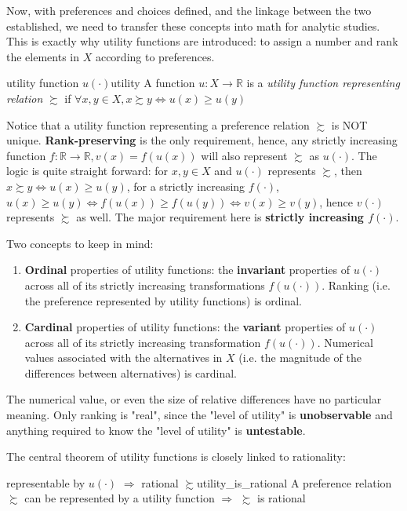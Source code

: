 Now, with preferences and choices defined, and the linkage between the two established, we need to transfer these concepts into math for analytic studies.
This is exactly why utility functions are introduced: to assign a number and rank the elements in $X$ according to preferences.

\begin{definition}{utility function $u(\cdot)$}{utility}
    A function $u:X\rightarrow\mathbb{R}$ is a \textit{utility function representing relation} $\succsim$ if $\forall x,y\in X,x\succsim y\Leftrightarrow u(x)\geq u(y)$
\end{definition}

Notice that a utility function representing a preference relation $\succsim$ is NOT unique. \textbf{Rank-preserving} is the only requirement, hence, any 
strictly increasing function $f:\mathbb{R}\rightarrow\mathbb{R},v(x)=f(u(x))$ will also represent $\succsim$ as $u(\cdot)$. The logic is quite straight forward: for $x,y\in X$ and $u(\cdot)$ represents $\succsim$, then $x\succsim y \Leftrightarrow u(x)\geq u(y)$, for a strictly increasing $f(\cdot)$, $u(x)\geq u(y)\Leftrightarrow f(u(x))\geq f(u(y))\Leftrightarrow v(x)\geq v(y)$, hence $v(\cdot)$ represents $\succsim$ as well.
The major requirement here is \textbf{strictly increasing $f(\cdot)$}.

Two concepts to keep in mind:
\begin{enumerate}
    \item \textbf{Ordinal} properties of utility functions: the \textbf{invariant} properties of $u(\cdot)$ across all of its strictly increasing transformations $f(u(\cdot))$. Ranking (i.e. the preference represented by utility functions) is ordinal.
    \item \textbf{Cardinal} properties of utility functions: the \textbf{variant} properties of $u(\cdot)$ across all of its strictly increasing transformation $f(u(\cdot))$. Numerical values associated with the alternatives in $X$ (i.e. the magnitude of the differences between alternatives) is cardinal.
\end{enumerate}

The numerical value, or even the size of relative differences have no particular meaning. Only ranking is "real", since the "level of utility" is \textbf{unobservable} and anything required to know the "level of utility" is \textbf{untestable}.

The central theorem of utility functions is closely linked to rationality:
\begin{theorem}{representable by $u(\cdot)$ $\Rightarrow$ rational $\succsim$}{utility_is_rational}
    A preference relation $\succsim$ can be represented by a utility function $\Rightarrow$ $\succsim$ is rational
\end{theorem}

